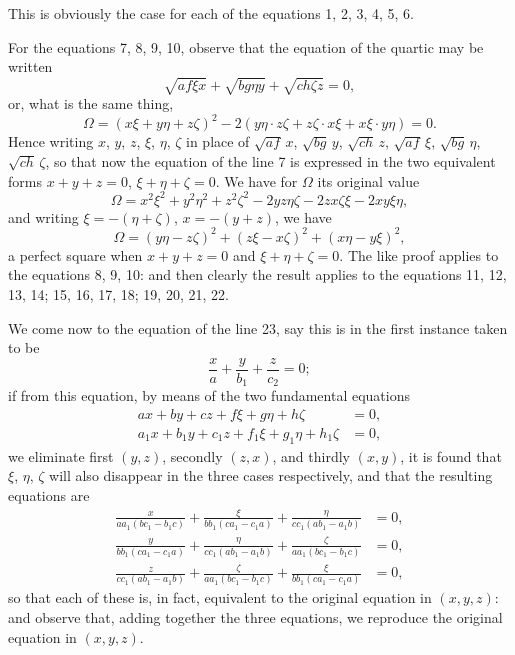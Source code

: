 \documentclass[11pt,a4paper]{article}
\theoremstyle{plain}
\theoremstyle{definition}
\theoremstyle{remark}
\begin{document}
This is obviously the case for each of the equations 1, 2, 3, 4, 5, 6.

For the equations 7, 8, 9, 10, observe that the equation of the quartic may be written
\[
\sqrt{af\xi x} + \sqrt{bg\eta y} + \sqrt{ch\zeta z} = 0,
\]
or, what is the same thing,
\[
\Omega = (x\xi + y\eta + z\zeta)^2 - 2(y\eta\cdot z\zeta + z\zeta\cdot x\xi + x\xi\cdot y\eta) = 0.
\]
Hence writing $x$, $y$, $z$, $\xi$, $\eta$, $\zeta$ in place of $\sqrt{af}\,x$, $\sqrt{bg}\,y$, $\sqrt{ch}\,z$, $\sqrt{af}\,\xi$, $\sqrt{bg}\,\eta$, $\sqrt{ch}\,\zeta$, so that now the equation of the line 7 is expressed in the two equivalent forms $x + y + z = 0$, $\xi + \eta + \zeta = 0$. We have for $\Omega$ its original value
\[
\Omega = x^2\xi^2 + y^2\eta^2 + z^2\zeta^2 - 2yz\eta\zeta - 2zx\zeta\xi - 2xy\xi\eta,
\]
and writing $\xi = -(\eta + \zeta)$, $x = -(y+z)$, we have
\[
\Omega = (y\eta - z\zeta)^2 + (z\xi - x\zeta)^2 + (x\eta - y\xi)^2,
\]
a perfect square when $x + y + z = 0$ and $\xi + \eta + \zeta = 0$. The like proof applies to the equations 8, 9, 10: and then clearly the result applies to the equations 11, 12, 13, 14; 15, 16, 17, 18; 19, 20, 21, 22.

We come now to the equation of the line 23, say this is in the first instance taken to be
\[
\frac{x}{a} + \frac{y}{b_1} + \frac{z}{c_2} = 0;
\]
if from this equation, by means of the two fundamental equations
\begin{align*}
ax + by + cz + f\xi + g\eta + h\zeta &= 0,\\
a_1x + b_1y + c_1z + f_1\xi + g_1\eta + h_1\zeta &= 0,
\end{align*}
we eliminate first $(y,z)$, secondly $(z,x)$, and thirdly $(x,y)$, it is found that $\xi$, $\eta$, $\zeta$ will also disappear in the three cases respectively, and that the resulting equations are
\begin{align*}
\frac{x}{aa_1(bc_1-b_1c)} + \frac{\xi}{bb_1(ca_1-c_1a)} + \frac{\eta}{cc_1(ab_1-a_1b)} &= 0,\\
\frac{y}{bb_1(ca_1-c_1a)} + \frac{\eta}{cc_1(ab_1-a_1b)} + \frac{\zeta}{aa_1(bc_1-b_1c)} &= 0,\\
\frac{z}{cc_1(ab_1-a_1b)} + \frac{\zeta}{aa_1(bc_1-b_1c)} + \frac{\xi}{bb_1(ca_1-c_1a)} &= 0,
\end{align*}
so that each of these is, in fact, equivalent to the original equation in $(x,y,z)$: and observe that, adding together the three equations, we reproduce the original equation in $(x,y,z)$.
\end{document}
